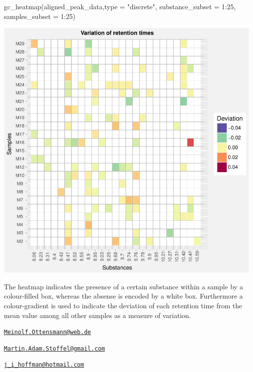 \begin{Schunk}
\begin{Sinput}
gc_heatmap(aligned_peak_data,type = "discrete", substance_subset = 1:25, samples_subset = 1:25)
\end{Sinput}

\includegraphics{ottensmann-stoffel-hoffman_files/figure-latex/unnamed-chunk-8-1} \end{Schunk}

The heatmap indicates the presence of a certain substance within a
sample by a colour-filled box, whereas the absense is encoded by a white
box. Furthermore a colour-gradient is used to indicate the deviation of
each retention time from the mean value among all other samples as a
measure of variation. 

\address{%
Meinolf Ottensmann\\
Department of Animal Behaviour\\
Bielefeld University\\ Morgenbreede 45\\ 33615 Bielefeld\\
}
\href{mailto:Meinolf.Ottensmann@web.de}{\nolinkurl{Meinolf.Ottensmann@web.de}}

\address{%
Martin A. Stoffel\\
Department of Animal Behaviour\\
Bielefeld University\\ Morgenbreede 45\\ 33615 Bielefeld\\
}
\href{mailto:Martin.Adam.Stoffel@gmail.com}{\nolinkurl{Martin.Adam.Stoffel@gmail.com}}

\address{%
Joseph I. Hoffman\\
Department of Animal Behaviour\\
Bielefeld University\\ Morgenbreede 45\\ 33615 Bielefeld\\
}
\href{mailto:j_i_hoffman@hotmail.com}{\nolinkurl{j\_i\_hoffman@hotmail.com}}

